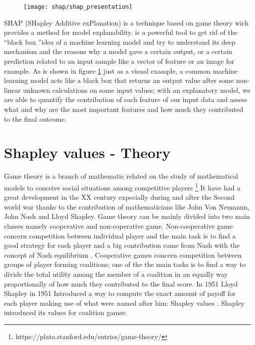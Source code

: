 \documentclass[12pt]{report}
\begin{document}
\begin{figure}[h]
\centering
\texttt{[image: shap/shap\_presentation]}
\caption{}\label{fig:shap_waterfall}
\end{figure}


SHAP (SHapley Additive exPlanation) is a technique based on game theory wich provides a method for model explanability.
is a powerful tool to get rid of the \textquotedblleft black box \textquotedblright idea of a machine learning model and try to understand its deep mechanism and the reasons why a model gave a certain output, or a certain prediction related to an input sample like a vector of feature or an image for example.
As is shown in figure \ref{fig:shap_waterfall} just as a visual example, a common machine learning model acts like a black box that returns an output value after some non-linear unknown calculations on some input values; with an explanatory model, we are able to quantify the contribution of each feature of our input data and assess what and why are the most important features and how much they contributed to the final outcome.




\section{Shapley values - Theory}

Game theory is a branch of mathematic related on the study of mathematical models to  conceive social situations among competitive players \footnote{https://plato.stanford.edu/entries/game-theory/}
It have had a great development in the XX century expecially during and after the Second world war thanks to the contribution of mathematicians like John Von Neumann, John Nash and Lloyd Shapley.
Game theory can be mainly divided into two main classes namely cooperative and non-coperative game.
Non-cooperative game concern competition between individual player and the main task is to find a good strategy for each player and a big contribution came from Nash with the concept of Nash equilibrium \cite{nash-1950}.
Cooperative games concern competition between groups of player forming coalitions; one of the the main tasks is to find a way to divide the total utility among the member of a coalition in an equally way proportionally of how much they contributed to the final score.
In 1951 Lloyd Shapley in 1951 Introduced a way to compute the exact amount of payoff for each player making use of what were named after him: Shapley values \cite{shap-1951}\cite{shap-1953}.
Shapley introduced its values for coalition games:
\end{document}
